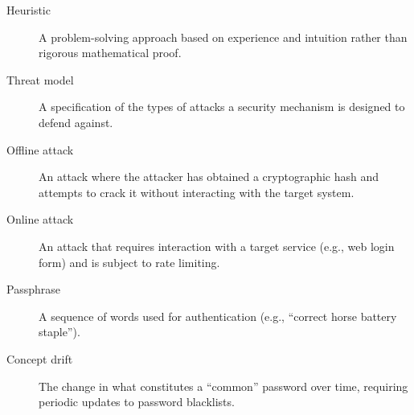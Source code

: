 \documentclass[english,12pt,twoside,a4paper]{report}
\begin{document}
\begin{description}
    \item[Heuristic] A problem-solving approach based on experience and intuition rather than rigorous mathematical proof.
    \item[Threat model] A specification of the types of attacks a security mechanism is designed to defend against.
    \item[Offline attack] An attack where the attacker has obtained a cryptographic hash and attempts to crack it without interacting with the target system.
    \item[Online attack] An attack that requires interaction with a target service (e.g., web login form) and is subject to rate limiting.
    \item[Passphrase] A sequence of words used for authentication (e.g., ``correct horse battery staple'').
    \item[Concept drift] The change in what constitutes a ``common'' password over time, requiring periodic updates to password blacklists.
\end{description}


\newpage


\end{document}
